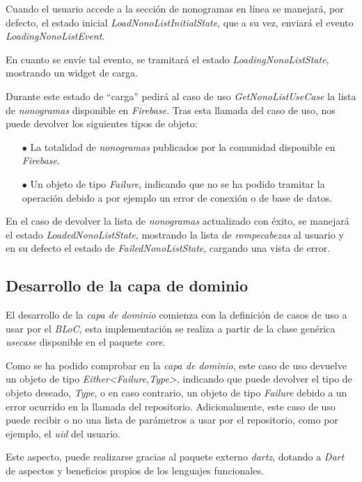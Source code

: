 Cuando el usuario accede a la sección de nonogramas en línea se manejará, por defecto, el estado
inicial \textit{LoadNonoListInitialState}, que a su vez, enviará el evento \textit{LoadingNonoListEvent}.

En cuanto se envíe tal evento, se tramitará el estado \textit{LoadingNonoListState}, mostrando
un widget de carga.

Durante este estado de ``carga'' pedirá al caso de uso \textit{GetNonoListUseCase} la lista de \textit{nonogramas}
disponible en \textit{Firebase}. Tras esta llamada del caso de uso, nos puede devolver los siguientes
tipos de objeto:

\begin{itemize}
  \item[$\bullet$] La totalidad de \textit{nonogramas} publicados por la comunidad disponible en \textit{Firebase}.
  \item[$\bullet$] Un objeto de tipo \textit{Failure}, indicando que no se ha podido tramitar la operación 
  debido a por ejemplo un error de conexión o de base de datos.
\end{itemize}

En el caso de devolver la lista de \textit{nonogramas} actualizado con éxito, se manejará el estado
\textit{LoadedNonoListState}, mostrando la lista de \textit{rompecabezas} al usuario y en su defecto el estado 
de \textit{FailedNonoListState}, cargando una vista de error.

\break

\subsection{Desarrollo de la capa de dominio}
El desarrollo de la \textit{capa de dominio} comienza con la definición de casos de uso a usar por el \textit{BLoC},
esta implementación se realiza a partir de la clase genérica \textit{usecase} disponible en el paquete \textit{core}.

Como se ha podido comprobar en la \textit{capa de dominio}, este caso de uso devuelve un objeto
de tipo \textit{Either<Failure,Type>}, indicando que puede devolver el tipo de objeto deseado, \textit{Type}, o en caso contrario,
un objeto de tipo \textit{Failure} debido a un error ocurrido en la llamada del repositorio. Adicionalmente, este caso de uso puede
recibir o no una lista de parámetros a usar por el repositorio, como por ejemplo, el \textit{uid} del usuario.

Este aspecto, puede realizarse gracias al paquete externo \textit{dartz}, dotando a \textit{Dart} de aspectos y 
beneficios propios de los lenguajes funcionales.

